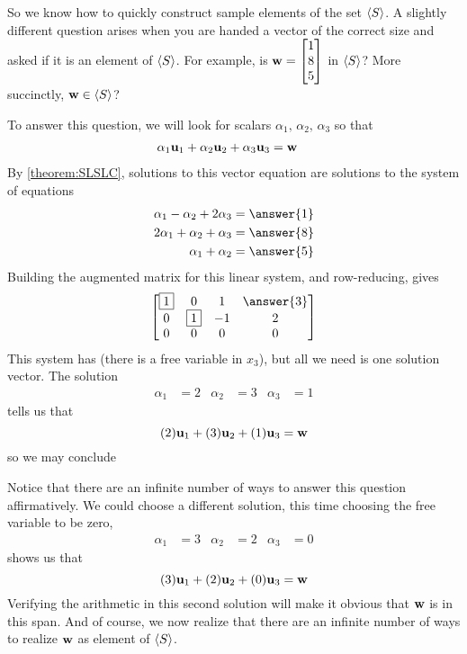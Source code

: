 \documentclass{ximera}
\begin{document}
\begin{example}
  \begin{question}
    So we know how to quickly construct sample elements of the set
    $\left\langle S\right\rangle$.  A slightly different question arises when you are
    handed a vector of the correct size and asked if it is an element
    of $\left\langle S\right\rangle$.  For example, is $\mathbf{w}=\begin{bmatrix}1\\8\\5\end{bmatrix}$ in
    $\left\langle S\right\rangle$?  More succinctly, $\mathbf{w}\in\left\langle S\right\rangle$?

    To answer this question, we will look for scalars
    $\alpha_1,\,\alpha_2,\,\alpha_3$ so that
    \begin{align*}
      \alpha_1\mathbf{u}_1+\alpha_2\mathbf{u}_2+\alpha_3\mathbf{u}_3&=\mathbf{w}
    \end{align*}
    By \ref{theorem:SLSLC}, solutions to this vector equation are
    solutions to the system of equations
    \begin{align*}
      \alpha_1-\alpha_2+2\alpha_3&=\answer{1}\\
      2\alpha_1+\alpha_2+\alpha_3&=\answer{8}\\
      \alpha_1+\alpha_2&=\answer{5}
    \end{align*}
    Building the augmented matrix for this linear system, and row-reducing, gives
    \[
      \begin{bmatrix}
        \leading{1} & 0 & 1 & \answer{3}\\
        0 & \leading{1} & -1 & 2\\
        0 & 0 & 0 & 0
      \end{bmatrix}
    \]
    This system has  (there is a free
    variable in $x_3$), but all we need is one solution vector.  The
    solution
    \begin{align*}
      \alpha_1 &= 2
      &
        \alpha_2 &= 3
      &
        \alpha_3 &= 1
    \end{align*}
    tells us that
    \[
      (2)\mathbf{u}_1+(3)\mathbf{u}_2+(1)\mathbf{u}_3=\mathbf{w}
    \]
    so we may conclude
    \begin{multipleChoice}
    \end{multipleChoice} 
    
    Notice that there are an infinite number of ways to answer this
    question affirmatively.  We could choose a different solution,
    this time choosing the free variable to be zero,
    \begin{align*}
      \alpha_1 &= 3
      &
        \alpha_2 &= 2
      &
        \alpha_3 &= 0
    \end{align*}
    shows us that
    \[
      (3)\mathbf{u}_1+(2)\mathbf{u}_2+(0)\mathbf{u}_3=\mathbf{w}
    \]
    Verifying the arithmetic in this second solution will make it
    obvious that $\mathbf{w}$ is in this span.  And of course, we now
    realize that there are an infinite number of ways to realize
    $\mathbf{w}$ as element of $\left\langle S\right\rangle$.
  \end{question}


\end{example}
\end{document}
